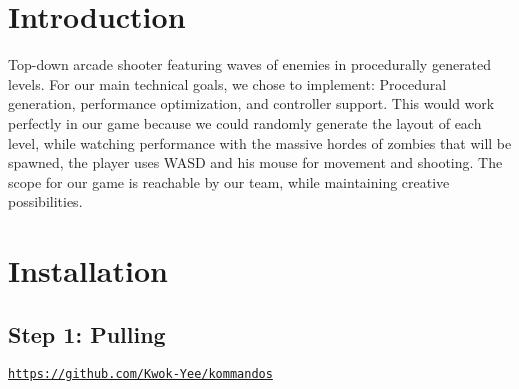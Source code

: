 \hypertarget{index_intro_sec}{}\section{Introduction}\label{index_intro_sec}
Top-\/down arcade shooter featuring waves of enemies in procedurally generated levels. For our main technical goals, we chose to implement\-: Procedural generation, performance optimization, and controller support. This would work perfectly in our game because we could randomly generate the layout of each level, while watching performance with the massive hordes of zombies that will be spawned, the player uses W\-A\-S\-D and his mouse for movement and shooting. The scope for our game is reachable by our team, while maintaining creative possibilities.\hypertarget{index_install_sec}{}\section{Installation}\label{index_install_sec}
\hypertarget{index_step1}{}\subsection{Step 1\-: Pulling}\label{index_step1}
\href{https://github.com/Kwok-Yee/kommandos}{\tt https\-://github.\-com/\-Kwok-\/\-Yee/kommandos} 